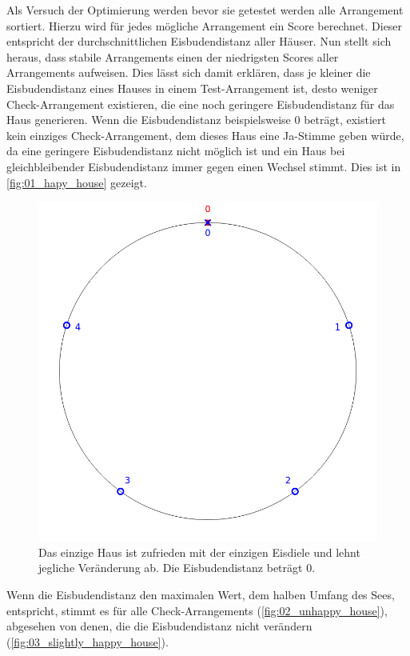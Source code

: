 \documentclass[a4paper,10pt,ngerman]{scrartcl}
\begin{document}
\medskip
Als Versuch der Optimierung werden bevor sie getestet werden alle Arrangement sortiert.
Hierzu wird für jedes mögliche Arrangement ein Score berechnet.
Dieser entspricht der durchschnittlichen Eisbudendistanz aller Häuser.
Nun stellt sich heraus, dass stabile Arrangements einen der niedrigsten Scores aller Arrangements aufweisen.
Dies lässt sich damit erklären, dass je kleiner die Eisbudendistanz eines Hauses in einem Test-Arrangement ist, desto weniger Check-Arrangement existieren, die eine noch geringere Eisbudendistanz für das Haus generieren.
Wenn die Eisbudendistanz beispielsweise $0$ beträgt, existiert kein einziges Check-Arrangement, dem dieses Haus eine Ja-Stimme geben würde, da eine geringere Eisbudendistanz nicht möglich ist und ein Haus bei gleichbleibender Eisbudendistanz immer gegen einen Wechsel stimmt.
Dies ist in \autoref{fig:01_hapy_house} gezeigt.
\begin{figure}[ht]
    \centering
    \includegraphics[width=0.4\linewidth]{01_happy_house.png}
    \caption{Das einzige Haus ist zufrieden mit der einzigen Eisdiele und lehnt jegliche Veränderung ab. Die Eisbudendistanz beträgt $0$.}
    \label{fig:01_hapy_house}
\end{figure}
Wenn die Eisbudendistanz den maximalen Wert, dem halben Umfang des Sees, entspricht, stimmt es für alle Check-Arrangements (\autoref{fig:02_unhappy_house}), abgesehen von denen, die die Eisbudendistanz nicht verändern (\autoref{fig:03_slightly_happy_house}).
\end{document}
